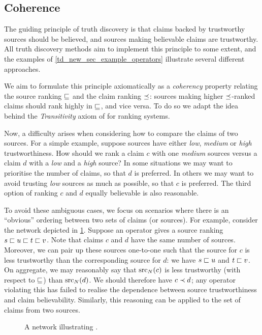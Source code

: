 \subsection{Coherence}

The guiding principle of truth discovery is that claims backed by trustworthy
sources should be believed, and sources making believable claims are
trustworthy. All truth discovery methods aim to implement this principle to
some extent, and the examples of \cref{td_new_sec_example_operators} illustrate
several different approaches.

We aim to formulate this principle axiomatically as a \emph{coherency} property
relating the source ranking $\sqsubseteq$ and the claim ranking $\preceq$: sources making
higher $\preceq$-ranked claims should rank highly in $\sqsubseteq$, and vice versa. To do
so we adapt the idea behind the \emph{Transitivity} axiom of
\textcite{altman2008} for ranking systems.

Now, a difficulty arises when considering how to compare the claims of two
sources. For a simple example, suppose sources have either \emph{low},
\emph{medium} or \emph{high} trustworthiness. How should we rank a claim $c$
with one \emph{medium} sources versus a claim $d$ with a \emph{low} and a
\emph{high} source? In some situations we may want to prioritise the number of
claims, so that $d$ is preferred. In others we may want to avoid trusting
\emph{low} sources as much as possible, so that $c$ is preferred. The third
option of ranking $c$ and $d$ equally believable is also reasonable.

To avoid these ambiguous cases, we focus on scenarios where there is an
``obvious'' ordering between two sets of claims (or sources). For example,
consider the network depicted in \cref{td_new_fig_coherence_intro}. Suppose an
operator gives a source ranking $s \sqsubset u \sqsubset t \sqsubset v$. Note that claims $c$
and $d$ have the same number of sources. Moreover, we can pair up these sources
one-to-one such that the source for $c$ is less trustworthy than the
corresponding source for $d$: we have $s \sqsubset u$ and $t \sqsubset v$. On aggregate,
we may reasonably say that $\operatorname{src}_N(c)$ is less trustworthy (with respect to
$\sqsubseteq$) than $\operatorname{src}_N(d)$. We should therefore have $c \prec d$; any operator
violating this has failed to realise the dependence between source
trustworthiness and claim believability. Similarly, this reasoning can be
applied to the set of claims from two sources.

\begin{figure}
    \centering

    \caption{
        A network illustrating \claimcoherence{}.
    }
    \label{td_new_fig_coherence_intro}
\end{figure}

